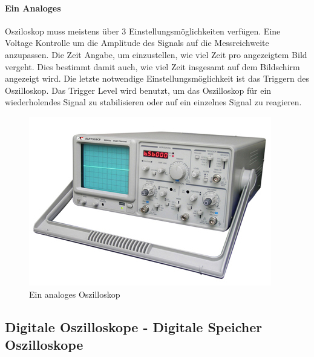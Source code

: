 \documentclass{article}
\begin{document}
 \paragraph{Ein Analoges}
Osziloskop muss meistens über 3 Einstellungsmöglichkeiten verfügen.
Eine Voltage Kontrolle um die Amplitude des Signals auf die Messreichweite anzupassen. Die Zeit Angabe, um einzustellen, wie viel Zeit pro angezeigtem Bild vergeht. Dies bestimmt damit auch, wie viel Zeit insgesamt auf dem Bildschirm angezeigt wird. Die letzte notwendige Einstellungsmöglichkeit ist das Triggern des Oszilloskop. Das Trigger Level wird benutzt, um das Oszilloskop für ein wiederholendes Signal zu stabilisieren oder auf ein einzelnes Signal zu reagieren.\cite{mcclurel}
\begin{figure}[H]
  \includegraphics[width=\textwidth]{"analog-oscilloscope"}
  \caption[\textbf{analog-oscilloscope.jpg},  Quelle:https://www.testandmeasurementtips.com/analog-oscilloscope/ (zuletzt abgerufen: 04.09.2021)]{Ein analoges Oszilloskop}
\end{figure}
\newline

\subsection{Digitale Oszilloskope - Digitale Speicher Oszilloskope}
\end{document}
